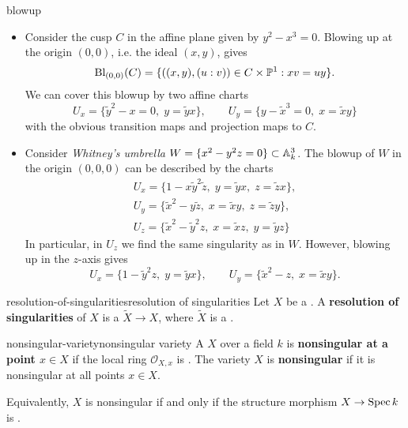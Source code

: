 \begin{example}{blowup}
    \begin{itemize}
        \item Consider the cusp $C$ in the affine plane given by $y^2 - x^3 = 0$. Blowing up at the origin $(0, 0)$, i.e. the ideal $(x, y)$, gives
        \[ \textup{Bl}_{(0, 0)}(C) = \{ ((x, y), (u : v)) \in C \times \PP^1 : xv = uy \} . \]
        We can cover this blowup by two affine charts
        \[ U_x = \{ \tilde{y}^2 - x = 0, \; y = \tilde{y} x \}, \qquad U_y = \{ y - \tilde{x}^3 = 0, \; x = \tilde{x} y \} \]
        with the obvious transition maps and projection maps to $C$.
        
        \item Consider \textit{Whitney's umbrella} $W = \{ x^2 - y^2 z = 0 \} \subset \AA^3_k$. The blowup of $W$ in the origin $(0, 0, 0)$ can be described by the charts
        \[ \begin{aligned}
            U_x = \{ 1 - x \tilde{y}^2 \tilde{z}, \; y = \tilde{y} x, \; z = \tilde{z} x \} , \\
            U_y = \{ \tilde{x}^2 - y \tilde{z}, \; x = \tilde{x} y, \; z = \tilde{z} y \} , \\
            U_z = \{ \tilde{x}^2 - \tilde{y}^2 z, \; x = \tilde{x} z, \; y = \tilde{y} z \}
        \end{aligned} \]
        In particular, in $U_z$ we find the same singularity as in $W$. However, blowing up in the $z$-axis gives
        \[ U_x = \{ 1 - \tilde{y}^2 z, \; y = \tilde{y} x \}, \qquad U_y = \{ \tilde{x}^2 - z, \; x = \tilde{x} y \} . \]
    \end{itemize}
\end{example}

\begin{topic}{resolution-of-singularities}{resolution of singularities}
    Let $X$ be a . A \textbf{resolution of singularities} of $X$ is a   $\widetilde{X} \to X$, where $\widetilde{X}$ is a .
\end{topic}

\begin{topic}{nonsingular-variety}{nonsingular variety}
    A  $X$ over a field $k$ is \textbf{nonsingular at a point $x \in X$} if the local ring $\mathcal{O}_{X, x}$ is . The variety $X$ is \textbf{nonsingular} if it is nonsingular at all points $x \in X$.
    
    Equivalently, $X$ is nonsingular if and only if the structure morphism $X \to \Spec k$ is .
\end{topic}

